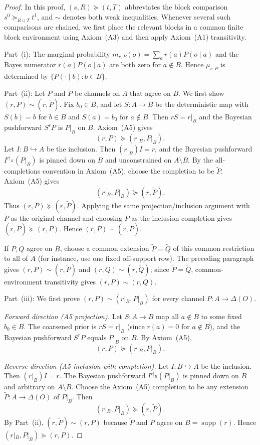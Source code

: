 \documentclass[11pt,a4paper]{article}
\theoremstyle{definition}
\newcommand{\1}{\mathbf 1}
\begin{document}
\begin{proof}
In this proof, $(s,R)\succeq(t,T)$ abbreviates the block comparison
$s^0\succeq_{R\sqcup T}t^1$, and $\sim$ denotes both weak inequalities.  Whenever several such comparisons are chained,
we first place the relevant blocks in a common finite block environment using Axiom~\textup{(A3)} and then apply
Axiom~\textup{(A1)} transitivity.

Part~(i): The marginal probability $m_{r,P}(o)=\sum_a r(a)P(o\mid a)$ and the Bayes numerator $r(a)P(o\mid a)$ are both
zero for $a\notin B$.  Hence $\mu_{r,P}$ is determined by $\{P(\cdot\mid b):b\in B\}$.

Part~(ii): Let $P$ and $\widetilde P$ be channels on $A$ that agree on $B$.  We first show
$(r,P)\sim(r,\widetilde P)$.  Fix $b_0\in B$, and let $S:A\to B$ be the deterministic map with $S(b)=b$ for $b\in B$
and $S(a)=b_0$ for $a\notin B$.  Then $rS=r|_B$ and the Bayesian pushforward $S^rP$ is $P|_B$ on $B$.  Axiom~\textup{(A5)}
gives
\[
(r,P)\succeq(r|_B,P|_B).
\]
Let $I:B\hookrightarrow A$ be the inclusion.  Then $(r|_B)I=r$, and the Bayesian pushforward $I^{r|_B}(P|_B)$ is
pinned down on $B$ and unconstrained on $A\setminus B$.  By the all-completions convention in Axiom~\textup{(A5)}, choose
the completion to be $\widetilde P$.  Axiom~\textup{(A5)} gives
\[
(r|_B,P|_B)\succeq(r,\widetilde P).
\]
Thus $(r,P)\succeq(r,\widetilde P)$.  Applying the same projection/inclusion argument with $\widetilde P$ as the original
channel and choosing $P$ as the inclusion completion gives $(r,\widetilde P)\succeq(r,P)$.  Hence
$(r,P)\sim(r,\widetilde P)$.

If $P,Q$ agree on $B$, choose a common extension $\widetilde P=\widetilde Q$ of this common restriction to all of $A$
(for instance, use one fixed off-support row).  The preceding paragraph gives
$(r,P)\sim(r,\widetilde P)$ and $(r,Q)\sim(r,\widetilde Q)$; since $\widetilde P=\widetilde Q$, common-environment
transitivity gives $(r,P)\sim(r,Q)$.

Part~(iii): We first prove $(r,P)\sim(r|_B,P|_B)$ for every channel $P:A\to\Delta(O)$.

\emph{Forward direction (A5 projection).}  Let $S:A\to B$ map all $a\notin B$ to some fixed $b_0\in B$.  The coarsened
prior is $rS=r|_B$ (since $r(a)=0$ for $a\notin B$), and the Bayesian pushforward $S^rP$ equals $P|_B$ on $B$.  By
Axiom~\textup{(A5)},
\[
(r,P)\succeq(r|_B,P|_B).
\]

\emph{Reverse direction (A5 inclusion with completion).}  Let $I:B\hookrightarrow A$ be the inclusion.  Then
$(r|_B)I=r$.  The Bayesian pushforward $I^{r|_B}(P|_B)$ is pinned down on $B$ and arbitrary on $A\setminus B$.  Choose
the Axiom~\textup{(A5)} completion to be any extension $\widetilde P:A\to\Delta(O)$ of $P|_B$.  Then
\[
(r|_B,P|_B)\succeq(r,\widetilde P).
\]
By Part~(ii), $(r,\widetilde P)\sim(r,P)$ because $\widetilde P$ and $P$ agree on $B=\operatorname{supp}(r)$.  Hence
$(r|_B,P|_B)\succeq(r,P)$.


\end{proof}
\end{document}
